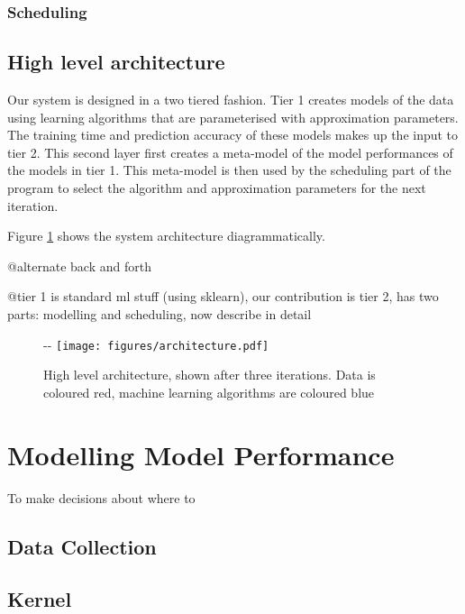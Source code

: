 \documentclass[a4paper,12pt,twoside,openright]{report}
\begin{document}
\subsubsection{Scheduling}
\subsection{High level architecture}
Our system is designed in a two tiered fashion. Tier 1 creates models of the data using learning algorithms that are parameterised with approximation parameters. The training time and prediction accuracy of these models makes up the input to tier 2. This second layer first creates a meta-model of the model performances of the models in tier 1. This meta-model is then used by the scheduling part of the program to select the algorithm and approximation parameters for the next iteration.

Figure \ref{architecture} shows the system architecture diagrammatically. 

@alternate back and forth

@tier 1 is standard ml stuff (using sklearn), our contribution is tier 2, has two parts: modelling and scheduling, now describe in detail

\begin{figure}[!ht]
  \begin{adjustwidth}{-\oddsidemargin-2in}{-\rightmargin-1.5in}
    \centering
    \texttt{[image: figures/architecture.pdf]}
    
  \end{adjustwidth}
  \caption{High level architecture, shown after three iterations. Data is coloured red, machine learning algorithms are coloured blue}
    \label{architecture}
\end{figure}




\section{Modelling Model Performance}
To make decisions about where to 


\subsection{Data Collection}


\subsection{Kernel}
\end{document}
